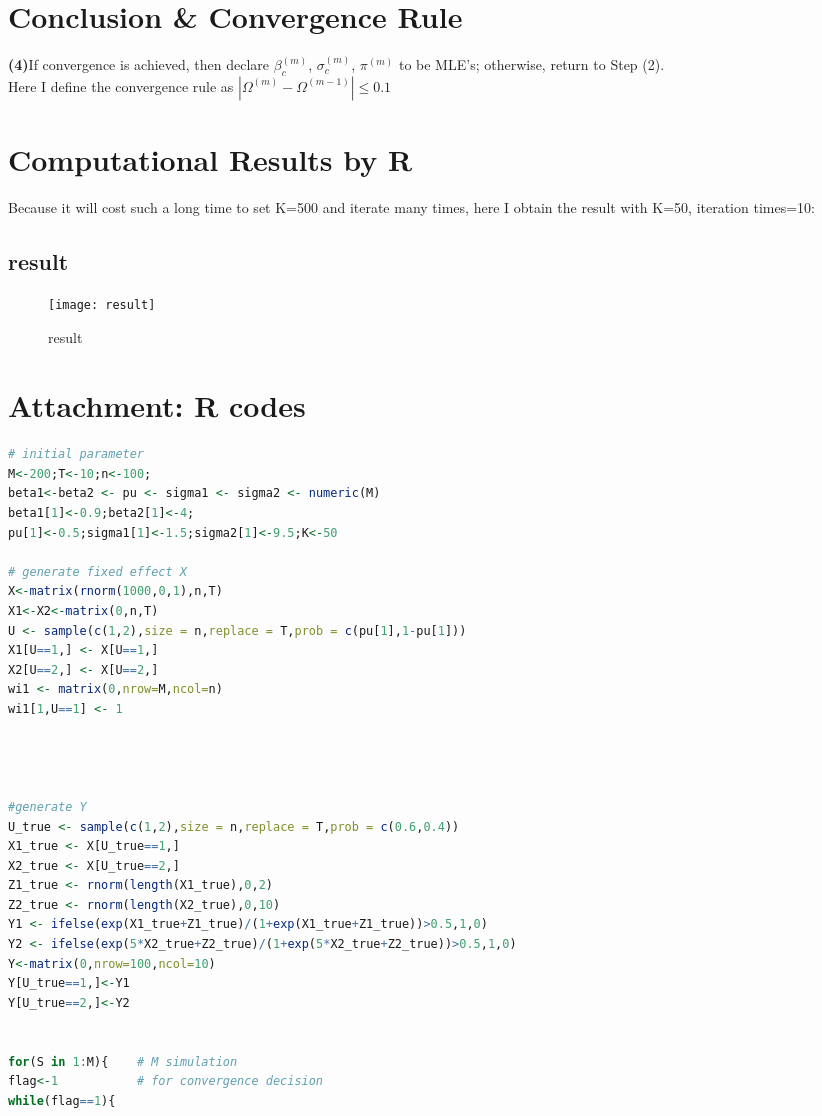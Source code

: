 \documentclass[10pt]{article}
\begin{document}
\begin{CJK}{UTF8}{gbsn}
\section{Conclusion \& Convergence Rule}
\textbf{(4)}If convergence is achieved, then declare $\beta_c^{(m)}$, $\sigma_c^{(m)}$, $\pi^{(m)}$ to be MLE's; otherwise, return to Step (2).
\bigskip
\\Here I define the convergence rule as $|\Omega^{(m)}-\Omega^{(m-1)}|\leq0.1$
\section{Computational Results by R}
Because it will cost such a long time to set K=500 and iterate many times, here I obtain the result with K=50, iteration times=10:
\subsection{result}

\begin{figure}[ht]
\centering
  \texttt{[image: result]} %
  \caption{result}
\label{fig:label}
\end{figure}
\section{Attachment: R codes}
\begin{lstlisting}[language=R]
# initial parameter
M<-200;T<-10;n<-100;
beta1<-beta2 <- pu <- sigma1 <- sigma2 <- numeric(M)
beta1[1]<-0.9;beta2[1]<-4;
pu[1]<-0.5;sigma1[1]<-1.5;sigma2[1]<-9.5;K<-50

# generate fixed effect X
X<-matrix(rnorm(1000,0,1),n,T)
X1<-X2<-matrix(0,n,T)
U <- sample(c(1,2),size = n,replace = T,prob = c(pu[1],1-pu[1]))
X1[U==1,] <- X[U==1,]
X2[U==2,] <- X[U==2,]
wi1 <- matrix(0,nrow=M,ncol=n)
wi1[1,U==1] <- 1




#generate Y
U_true <- sample(c(1,2),size = n,replace = T,prob = c(0.6,0.4))
X1_true <- X[U_true==1,]
X2_true <- X[U_true==2,]
Z1_true <- rnorm(length(X1_true),0,2)
Z2_true <- rnorm(length(X2_true),0,10)
Y1 <- ifelse(exp(X1_true+Z1_true)/(1+exp(X1_true+Z1_true))>0.5,1,0)
Y2 <- ifelse(exp(5*X2_true+Z2_true)/(1+exp(5*X2_true+Z2_true))>0.5,1,0)
Y<-matrix(0,nrow=100,ncol=10)
Y[U_true==1,]<-Y1
Y[U_true==2,]<-Y2


for(S in 1:M){    # M simulation
flag<-1           # for convergence decision
while(flag==1){
  

\end{lstlisting}
\end{CJK}
\end{document}
